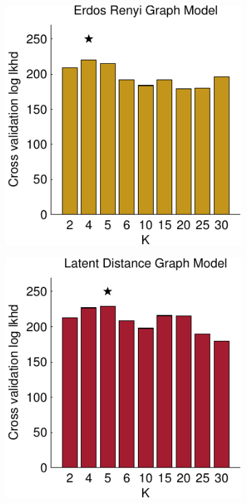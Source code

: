 \begin{figure}[!t]
\begin{subfigure}[T]{.24\linewidth}
\begin{center}
    \end{center}
  \end{subfigure}
  \begin{subfigure}[T]{.24\linewidth}
    \begin{center}
      \includegraphics[width=\linewidth]{figures/ch2/icpsr_xv_er}
    \end{center}
  \end{subfigure}
  \begin{subfigure}[T]{.24\linewidth}
    \begin{center}
      \includegraphics[width=\linewidth]{figures/ch2/icpsr_xv_dist}

\end{center}
\end{subfigure}
\end{figure}
